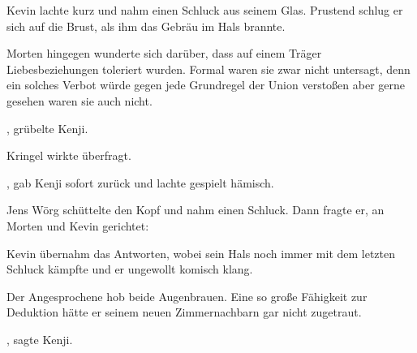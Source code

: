 \par

Kevin lachte kurz und nahm einen Schluck aus seinem Glas. Prustend schlug er sich auf die Brust, als ihm das Gebräu im Hals brannte.

\par

Morten hingegen wunderte sich darüber, dass auf einem Träger Liebesbeziehungen toleriert wurden. Formal waren sie zwar nicht untersagt, denn ein solches Verbot würde gegen jede Grundregel der Union verstoßen aber gerne gesehen waren sie auch nicht.

\par

, grübelte Kenji. 

\par

Kringel wirkte überfragt. 

\par

, gab Kenji sofort zurück und lachte gespielt hämisch.

\par

Jens Wörg schüttelte den Kopf und nahm einen Schluck. Dann fragte er, an Morten und Kevin gerichtet: 

\par

Kevin übernahm das Antworten, wobei sein Hals noch immer mit dem letzten Schluck kämpfte und er ungewollt komisch klang. 

\par

Der Angesprochene hob beide Augenbrauen. Eine so große Fähigkeit zur Deduktion hätte er seinem neuen Zimmernachbarn gar nicht zugetraut.

\par

, sagte Kenji.

\par

